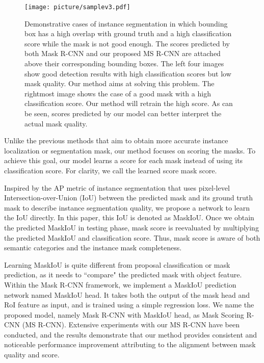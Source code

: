 \documentclass[10pt,twocolumn,letterpaper]{article}
\begin{document}
\begin{figure*}[!htp]
\centering
\texttt{[image: picture/samplev3.pdf]}
\caption{Demonstrative cases of instance segmentation in which bounding box has a high overlap with ground truth and a high classification score while the mask is not good enough. The scores predicted by both Mask R-CNN and our proposed MS R-CNN are attached above their corresponding bounding boxes. The left four images show good detection results with high classification scores but low mask quality. Our method aims at solving this problem. The rightmost image shows the case of a good mask with a high classification score. Our method will retrain the high score. As can be seen, scores predicted by our model can better interpret the actual mask quality.}
\label{fig:sample}
\end{figure*}

    Unlike the previous methods that aim to obtain more accurate instance localization or segmentation mask, our method focuses on scoring the masks. To achieve this goal, our model learns a score for each mask instead of using its classification score. For clarity, we call the learned score mask score.


    Inspired by the AP metric of instance segmentation that uses pixel-level Intersection-over-Union (IoU) between the predicted mask and its ground truth mask to describe instance segmentation quality, we propose a network to learn the IoU directly. 
In this paper, this IoU is denoted as MaskIoU. Once we obtain the predicted MaskIoU in testing phase, mask score is reevaluated by multiplying the predicted MaskIoU and classification score. Thus, mask score is aware of both semantic categories and the instance mask completeness. 
 
 


    Learning MaskIoU is quite different from proposal classification or mask prediction, as it needs to ``compare" the predicted mask with object feature. Within the Mask R-CNN framework, we implement a MaskIoU prediction network named MaskIoU head. It takes both the output of the mask head and RoI feature as input, and is trained using a simple regression loss. 
    We name the proposed model, namely Mask R-CNN with MaskIoU head, as Mask Scoring R-CNN (MS R-CNN). 
    Extensive experiments with our MS R-CNN have been conducted, and the results demonstrate that our method provides consistent and noticeable performance improvement attributing to the alignment between mask quality and score. 
    
\end{document}
